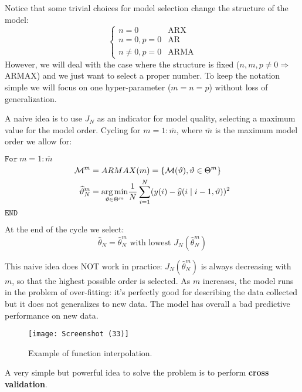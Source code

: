Notice that some trivial choices for model selection change the structure of the model:
\begin{equation*}
\begin{cases}
n=0 & \text{ARX}\\
n=0,p=0 & \text{AR}\\
n\neq 0,p=0 & \text{ARMA}
\end{cases}
\end{equation*}
However, we will deal with the case where the structure is fixed ($ n,m,p\neq 0\Longrightarrow$ ARMAX) and we just want to select a proper number. To keep the notation simple we will focus on one hyper-parameter ($ m=n=p$) without loss of generalization.

A naive idea is to use $ J_{N}$ as an indicator for model quality, selecting a maximum value for the model order. Cycling for $ m=1:\overline{m}$, where $\overline{m}$ is the maximum model order we allow for:

$ \mathtt{For }\ m=1:\overline{m}$
\begin{equation*}
\begin{aligned}
\mathcal{M}^{m} & =ARMAX(m) =\left\{\mathcal{M}(\vartheta) ,\vartheta \in \Theta ^{m}\right\}\\
\widehat{\vartheta }_{N}^{m} & =\underset{\vartheta \in \Theta ^{m}}{\operatorname*{arg\,min}}\frac{1}{N}\sum _{i=1}^{N}(y(i) -\widehat{y}(i\mid i-1,\vartheta))^{2}
\end{aligned}
\end{equation*}
$ \mathtt{END}$

At the end of the cycle we select:
\begin{equation*}
\hat{\theta }_{N} =\hat{\theta }_{N}^{m} \text{ with lowest } J_{N}(\hat{\theta }_{N}^{m})
\end{equation*}
\begin{obs}
	This naive idea does NOT work in practice: $ J_{N}(\hat{\theta }_{N}^{m})$ is always decreasing with $ m$, so that the highest possible order is selected. As $m$ increases, the model runs in the problem of over-fitting: it's perfectly good for describing the data collected but it does not generalizes to new data. The model has overall a bad predictive performance on new data.
\end{obs}
\begin{figure}[htpb]
    \centering
    \texttt{[image: Screenshot (33)]}
    \caption{Example of function interpolation.}
\end{figure}
\FloatBarrier
A very simple but powerful idea to solve the problem is to perform \textbf{cross validation}.

